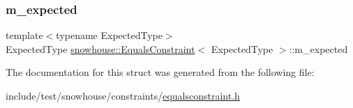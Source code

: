 \subsubsection{\texorpdfstring{m\_expected}{m\_expected}}
{\footnotesize\ttfamily template$<$typename Expected\+Type$>$ \\
Expected\+Type \mbox{\hyperlink{structsnowhouse_1_1EqualsConstraint}{snowhouse\+::\+Equals\+Constraint}}$<$ Expected\+Type $>$\+::m\+\_\+expected}



The documentation for this struct was generated from the following file\+:\begin{DoxyCompactItemize}
\item 
include/test/snowhouse/constraints/\mbox{\hyperlink{equalsconstraint_8h}{equalsconstraint.\+h}}\end{DoxyCompactItemize}
